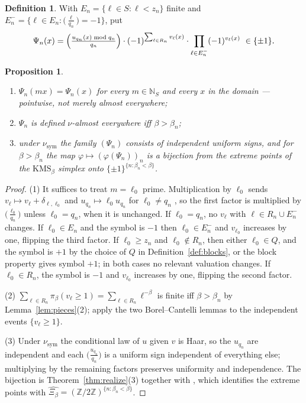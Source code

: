 \documentclass[11pt]{amsart}
\numberwithin{equation}{section}
\newtheorem{proposition}[theorem]{Proposition}
\theoremstyle{definition}
\newtheorem{definition}[theorem]{Definition}
\theoremstyle{remark}
\newcommand{\Z}{\mathbb{Z}}
\newcommand{\N}{\mathbb{N}}
\newcommand{\nusym}{\nu_{\mathrm{sym}}}
\begin{document}
\begin{definition}\label{def:Psin}
With $E_n=\{\ell\in S:\ell<z_n\}$ finite and
$E_n^-=\{\ell\in E_n:\bigl(\tfrac{\ell}{q_n}\bigr)=-1\}$, put
\begin{equation}\label{eq:Psin}
\Psi_n(x)=\Bigl(\tfrac{u_{q_n}(x)\bmod q_n}{q_n}\Bigr)\cdot(-1)^{\sum_{\ell\in R_n}v_\ell(x)}\cdot\prod_{\ell\in E_n^-}(-1)^{v_\ell(x)}\ \in\{\pm1\}.
\end{equation}
\end{definition}

\begin{proposition}\label{prop:Psin}
\begin{enumerate}
\item $\Psi_n(mx)=\Psi_n(x)$ for every $m\in\N_S$ and every $x$ in the domain --- pointwise,
not merely almost everywhere;
\item $\Psi_n$ is defined $\nu$-almost everywhere iff $\beta>\beta_n$;
\item under $\nusym$ the family $(\Psi_n)$ consists of independent uniform signs, and for
$\beta>\beta_n$ the map $\varphi\mapsto(\varphi(\Psi_n))_n$ is a bijection from the extreme
points of the $\mathrm{KMS}_\beta$ simplex onto $\{\pm1\}^{\{n:\beta_n<\beta\}}$.
\end{enumerate}
\end{proposition}

\begin{proof}
(1) It suffices to treat $m=\ell_0$ prime. Multiplication by $\ell_0$ sends
$v_\ell\mapsto v_\ell+\delta_{\ell,\ell_0}$ and $u_{q_n}\mapsto\ell_0u_{q_n}$ for
$\ell_0\ne q_n$ \cite[proof of Prop.~4.12]{Main}, so the first factor is multiplied by
$\bigl(\tfrac{\ell_0}{q_n}\bigr)$ unless $\ell_0=q_n$, when it is unchanged. If
$\ell_0=q_n$, no $v_\ell$ with $\ell\in R_n\cup E_n^-$ changes. If $\ell_0\in E_n$ and the
symbol is $-1$ then $\ell_0\in E_n^-$ and $v_{\ell_0}$ increases by one, flipping the third
factor. If $\ell_0\ge z_n$ and $\ell_0\notin R_n$, then either $\ell_0\in Q$, and the symbol
is $+1$ by the choice of $Q$ in Definition~\ref{def:blocks}, or the block property gives
symbol $+1$; in both cases no relevant valuation changes. If $\ell_0\in R_n$, the symbol is
$-1$ and $v_{\ell_0}$ increases by one, flipping the second factor.

(2) $\sum_{\ell\in R_n}\pi_\beta(v_\ell\ge1)=\sum_{\ell\in R_n}\ell^{-\beta}$ is finite iff
$\beta>\beta_n$ by Lemma~\ref{lem:pieces}(2); apply the two Borel--Cantelli lemmas to the
independent events $\{v_\ell\ge1\}$.

(3) Under $\nusym$ the conditional law of $u$ given $v$ is Haar, so the $u_{q_n}$ are
independent and each $\bigl(\tfrac{u_{q_n}}{q_n}\bigr)$ is a uniform sign independent of
everything else; multiplying by the remaining factors preserves uniformity and independence.
The bijection is Theorem~\ref{thm:realize}(3) together with \cite[Thm.~3.6]{Main}, which
identifies the extreme points with $\widehat{\Xi_\beta}=(\Z/2\Z)^{\{n:\beta_n<\beta\}}$.
\end{proof}
\end{document}
